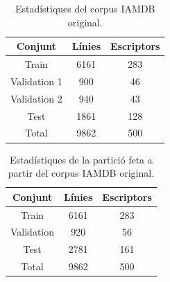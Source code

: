 \begin{table}
\centering
\begin{tabular}{|c|c|c|}
\hline
Conjunt & Línies & Escriptors \\
\hline
Train & 6161 & 283 \\
Validation 1 & 900 & 46 \\
Validation 2	 & 940 & 43 \\
Test & 1861 & 128\\
\hline
Total & 9862 & 500\\
\hline
\end{tabular}
\caption{Estadístiques del corpus IAMDB original.}\label{tab:iamdb_original}
\end{table}

\begin{table}
\centering
\begin{tabular}{|c|c|c|}
\hline
Conjunt & Línies & Escriptors \\
\hline
Train & 6161 & 283 \\
Validation & 920 & 56 \\
Test & 2781 & 161\\
\hline
Total & 9862 & 500\\
\hline
\end{tabular}
\caption{Estadístiques de la partició feta a partir del corpus IAMDB original.}\label{tab:iamdb_used}
\end{table}

